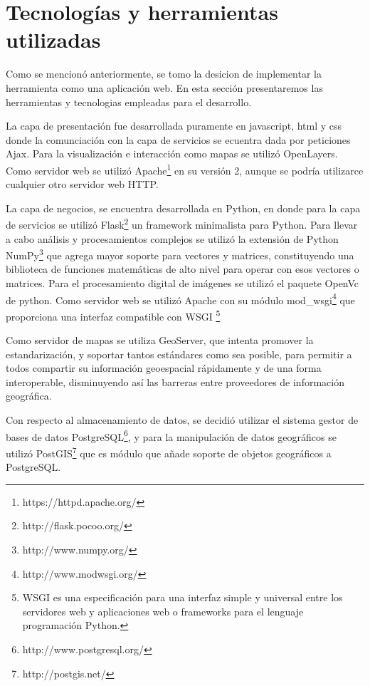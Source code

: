 \section{Tecnologías y herramientas utilizadas}
Como se mencionó anteriormente, se tomo la desicion de implementar la herramienta como una
aplicación web. En esta sección presentaremos las herramientas y tecnologias empleadas para el
desarrollo.

La capa de presentación fue desarrollada puramente en javascript, html y css donde la comunciación
con la capa de servicios se ecuentra dada por peticiones Ajax. Para la visualización e interacción
como mapas se utilizó OpenLayers. Como servidor web se utilizó
Apache\footnote{https://httpd.apache.org/} en su versión 2, aunque se podría utilizarce cualquier
otro servidor web HTTP.

La capa de negocios, se encuentra desarrollada en Python, en donde para la capa de servicios se
utilizó Flask\footnote{http://flask.pocoo.org/} un framework minimalista para Python. Para llevar
a cabo análisis y procesamientos complejos se utilizó la extensión de Python
NumPy\footnote{http://www.numpy.org/} que agrega mayor soporte para vectores y matrices,
constituyendo una biblioteca de funciones matemáticas de alto nivel para operar con esos vectores
o matrices. Para el procesamiento digital de imágenes se utilizó el paquete OpenVc de python. Como
servidor web se utilizó Apache con su módulo
mod\_wsgi\footnote{http://www.modwsgi.org/} que proporciona una interfaz compatible con
WSGI \footnote{WSGI es una especificación para una interfaz simple y universal entre los
servidores web y aplicaciones web o frameworks para el lenguaje programación Python.}

Como servidor de mapas se utiliza GeoServer, que intenta promover la estandarización, y soportar
tantos estándares como sea posible, para permitir a todos compartir su información geoespacial
rápidamente y de una forma interoperable, disminuyendo así las barreras entre proveedores de
información geográfica.

Con respecto al almacenamiento de datos, se decidió utilizar el sistema gestor de bases de datos
PostgreSQL\footnote{http://www.postgresql.org/}, y para la manipulación de datos geográficos se utilizó PostGIS\footnote{http://postgis.net/} que es módulo que añade soporte de objetos
geográficos a PostgreSQL.

